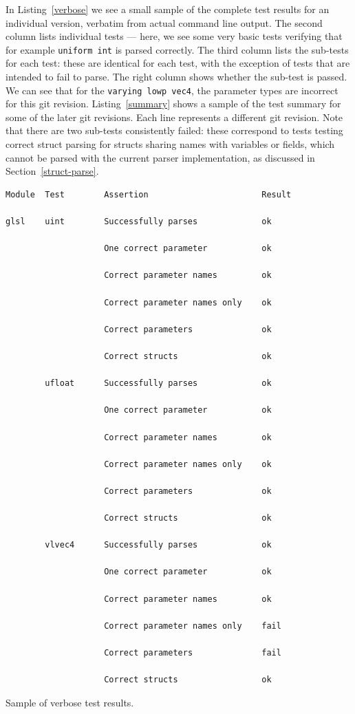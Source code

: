 \documentclass[12pt,twoside,notitlepage]{report}
\begin{document}
In Listing~\ref{verbose} we see a small sample of the complete test results for an individual version, verbatim from actual command line output. The second column lists individual tests --- here, we see some very basic tests verifying that for example \texttt{uniform int} is parsed correctly. The third column lists the sub-tests for each test: these are identical for each test, with the exception of tests that are intended to fail to parse. The right column shows whether the sub-test is passed. We can see that for the \texttt{varying lowp vec4}, the parameter types are incorrect for this git revision. Listing~\ref{summary} shows a sample of the test summary for some of the later git revisions. Each line represents a different git revision. Note that there are two sub-tests consistently failed: these correspond to tests testing correct struct parsing for structs sharing names with variables or fields, which cannot be parsed with the current parser implementation, as discussed in Section~\ref{struct-parse}.
\begin{listing}[H]
{
\begin{verbatim}
Module  Test        Assertion                       Result

glsl    uint        Successfully parses             ok

                    One correct parameter           ok

                    Correct parameter names         ok

                    Correct parameter names only    ok

                    Correct parameters              ok

                    Correct structs                 ok

        ufloat      Successfully parses             ok

                    One correct parameter           ok

                    Correct parameter names         ok

                    Correct parameter names only    ok

                    Correct parameters              ok

                    Correct structs                 ok

        vlvec4      Successfully parses             ok

                    One correct parameter           ok

                    Correct parameter names         ok

                    Correct parameter names only    fail

                    Correct parameters              fail

                    Correct structs                 ok

\end{verbatim}
}
\caption{Sample of verbose test results.\label{verbose}}
\end{listing}
\end{document}
